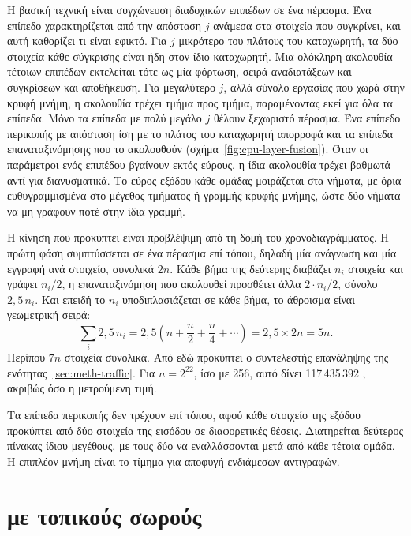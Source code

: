 Η βασική τεχνική είναι συγχώνευση διαδοχικών επιπέδων σε ένα πέρασμα. Ένα
επίπεδο χαρακτηρίζεται από την απόσταση $j$ ανάμεσα στα στοιχεία που συγκρίνει,
και αυτή καθορίζει τι είναι εφικτό. Για $j$ μικρότερο του πλάτους του
καταχωρητή, τα δύο στοιχεία κάθε σύγκρισης είναι ήδη στον ίδιο καταχωρητή. Μια
ολόκληρη ακολουθία τέτοιων επιπέδων εκτελείται τότε ως μία φόρτωση, σειρά
αναδιατάξεων και συγκρίσεων και αποθήκευση. Για μεγαλύτερο $j$, αλλά σύνολο
εργασίας που χωρά στην κρυφή μνήμη, η ακολουθία τρέχει τμήμα προς τμήμα,
παραμένοντας εκεί για όλα τα επίπεδα. Μόνο τα επίπεδα με πολύ μεγάλο $j$ θέλουν
ξεχωριστό πέρασμα. Ένα επίπεδο περικοπής με απόσταση ίση με το πλάτος του
καταχωρητή απορροφά και τα επίπεδα επαναταξινόμησης που το ακολουθούν
(σχήμα~\ref{fig:cpu-layer-fusion}). Όταν οι παράμετροι ενός επιπέδου βγαίνουν
εκτός εύρους, η ίδια ακολουθία τρέχει βαθμωτά αντί για διανυσματικά. Το εύρος
εξόδου κάθε ομάδας μοιράζεται στα νήματα, με όρια ευθυγραμμισμένα στο μέγεθος
τμήματος ή γραμμής κρυφής μνήμης, ώστε δύο νήματα να μη γράφουν ποτέ στην ίδια
γραμμή.

Η κίνηση που προκύπτει είναι προβλέψιμη από τη δομή του χρονοδιαγράμματος. Η
πρώτη φάση συμπτύσσεται σε ένα πέρασμα επί τόπου, δηλαδή μία ανάγνωση και μία
εγγραφή ανά στοιχείο, συνολικά $2n$. Κάθε βήμα της δεύτερης διαβάζει $n_i$
στοιχεία και γράφει $n_i/2$, η επαναταξινόμηση που ακολουθεί προσθέτει άλλα $2
\cdot n_i/2$, σύνολο $2{,}5\,n_i$. Και επειδή το $n_i$ υποδιπλασιάζεται σε κάθε
βήμα, το άθροισμα είναι γεωμετρική σειρά:
\[
	\sum_i 2{,}5\,n_i = 2{,}5 \left( n + \frac{n}{2} + \frac{n}{4} + \cdots \right) = 2{,}5 \times 2n = 5n.
\]
Περίπου $7n$ στοιχεία συνολικά. Από εδώ προκύπτει ο συντελεστής επανάληψης της
ενότητας~\ref{sec:meth-traffic}. Για $n = 2^{22}$,  ίσο με 256, αυτό
δίνει 117\,435\,392 , ακριβώς όσο η μετρούμενη τιμή.

Τα επίπεδα περικοπής δεν τρέχουν επί τόπου, αφού κάθε στοιχείο της εξόδου
προκύπτει από δύο στοιχεία της εισόδου σε διαφορετικές θέσεις. Διατηρείται
δεύτερος πίνακας ίδιου μεγέθους, με τους δύο να εναλλάσσονται μετά από κάθε
τέτοια ομάδα. Η επιπλέον μνήμη είναι το τίμημα για αποφυγή ενδιάμεσων
αντιγραφών.



\section{ με τοπικούς σωρούς}
\label{sec:cpu-mapreduce}

